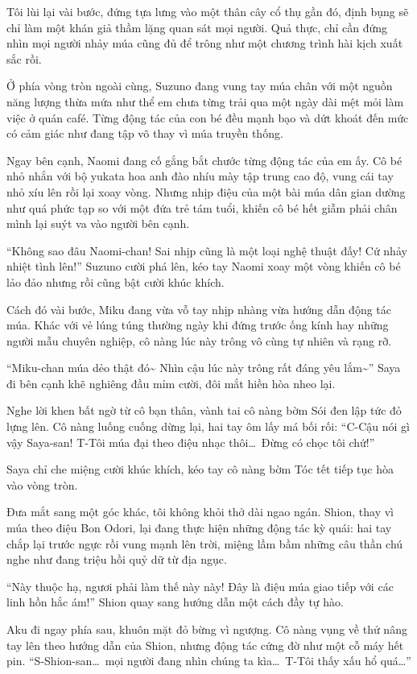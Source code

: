 \documentclass[../main.tex]{subfiles}
\begin{document}
Tôi lùi lại vài bước, đứng tựa lưng vào một thân cây cổ thụ gần đó, định bụng sẽ chỉ làm một khán giả thầm lặng quan sát mọi người. Quả thực, chỉ cần đứng nhìn mọi người nhảy múa cũng đủ để trông như một chương trình hài kịch xuất sắc rồi.

Ở phía vòng tròn ngoài cùng, Suzuno đang vung tay múa chân với một nguồn năng lượng thừa mứa như thể em chưa từng trải qua một ngày dài mệt mỏi làm việc ở quán café. Từng động tác của con bé đều mạnh bạo và dứt khoát đến mức có cảm giác như đang tập võ thay vì múa truyền thống.

Ngay bên cạnh, Naomi đang cố gắng bắt chước từng động tác của  em ấy. Cô bé nhỏ nhắn với bộ yukata hoa anh đào nhíu mày tập trung cao độ, vung cái tay nhỏ xíu lên rồi lại xoay vòng. Nhưng nhịp điệu của một bài múa dân gian dường như quá phức tạp so với một đứa trẻ tám tuổi, khiến cô bé hết giẫm phải chân mình lại suýt va vào người bên cạnh.

``Không sao đâu Naomi-chan! Sai nhịp cũng là một loại nghệ thuật đấy! Cứ nhảy nhiệt tình lên!'' Suzuno cười phá lên, kéo tay Naomi xoay một vòng khiến cô bé lảo đảo nhưng rồi cũng bật cười khúc khích.

Cách đó vài bước, Miku đang vừa vỗ tay nhịp nhàng vừa hướng dẫn động tác múa. Khác với vẻ lúng túng thường ngày khi đứng trước ống kính hay những người mẫu chuyên nghiệp, cô nàng lúc này trông vô cùng tự nhiên và rạng rỡ.

``Miku-chan múa dẻo thật đó\~{} Nhìn cậu lúc này trông rất đáng yêu lắm\~{}'' Saya đi bên cạnh khẽ nghiêng đầu mỉm cười, đôi mắt hiền hòa nheo lại.

Nghe lời khen bất ngờ từ cô bạn thân, vành tai cô nàng bờm Sói đen lập tức đỏ lựng lên. Cô nàng luống cuống dừng lại, hai tay ôm lấy má bối rối: ``C-Cậu nói gì vậy Saya-san! T-Tôi múa đại theo điệu nhạc thôi\dots\ Đừng có chọc tôi chứ!''

Saya chỉ che miệng cười khúc khích, kéo tay cô nàng bờm Tóc tết tiếp tục hòa vào vòng tròn.

Đưa mắt sang một góc khác, tôi không khỏi thở dài ngao ngán. Shion, thay vì múa theo điệu Bon Odori, lại đang thực hiện những động tác kỳ quái: hai tay chắp lại trước ngực rồi vung mạnh lên trời, miệng lầm bầm những câu thần chú nghe như đang triệu hồi quỷ dữ từ địa ngục.

``Này thuộc hạ, ngươi phải làm thế này này! Đây là điệu múa giao tiếp với các linh hồn hắc ám!'' Shion quay sang hướng dẫn một cách đầy tự hào.

Aku đi ngay phía sau, khuôn mặt đỏ bừng vì ngượng. Cô nàng vụng về thử nâng tay lên theo hướng dẫn của Shion, nhưng động tác cứng đờ như một cỗ máy hết pin. ``S-Shion-san\dots\ mọi người đang nhìn chúng ta kìa\dots\ T-Tôi thấy xấu hổ quá\dots''
\end{document}
